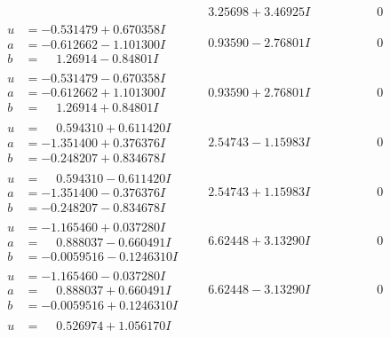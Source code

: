 \documentclass[1p]{elsarticle_modified}
\theoremstyle{definition}
\begin{document}
$$\begin{array}{c|c|c}
 & \phantom{-}3.25698 + 3.46925 I & \phantom{-0.000000 } 0 \\ \hline\begin{aligned}
u &= -0.531479 + 0.670358 I \\
a &= -0.612662 - 1.101300 I \\
b &= \phantom{-}1.26914 - 0.84801 I\end{aligned}
 & \phantom{-}0.93590 - 2.76801 I & \phantom{-0.000000 } 0 \\ \hline\begin{aligned}
u &= -0.531479 - 0.670358 I \\
a &= -0.612662 + 1.101300 I \\
b &= \phantom{-}1.26914 + 0.84801 I\end{aligned}
 & \phantom{-}0.93590 + 2.76801 I & \phantom{-0.000000 } 0 \\ \hline\begin{aligned}
u &= \phantom{-}0.594310 + 0.611420 I \\
a &= -1.351400 + 0.376376 I \\
b &= -0.248207 + 0.834678 I\end{aligned}
 & \phantom{-}2.54743 - 1.15983 I & \phantom{-0.000000 } 0 \\ \hline\begin{aligned}
u &= \phantom{-}0.594310 - 0.611420 I \\
a &= -1.351400 - 0.376376 I \\
b &= -0.248207 - 0.834678 I\end{aligned}
 & \phantom{-}2.54743 + 1.15983 I & \phantom{-0.000000 } 0 \\ \hline\begin{aligned}
u &= -1.165460 + 0.037280 I \\
a &= \phantom{-}0.888037 - 0.660491 I \\
b &= -0.0059516 - 0.1246310 I\end{aligned}
 & \phantom{-}6.62448 + 3.13290 I & \phantom{-0.000000 } 0 \\ \hline\begin{aligned}
u &= -1.165460 - 0.037280 I \\
a &= \phantom{-}0.888037 + 0.660491 I \\
b &= -0.0059516 + 0.1246310 I\end{aligned}
 & \phantom{-}6.62448 - 3.13290 I & \phantom{-0.000000 } 0 \\ \hline\begin{aligned}
u &= \phantom{-}0.526974 + 1.056170 I \\

\end{aligned}
\end{array}$$
\end{document}

